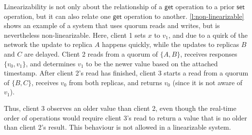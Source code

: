 Linearizability is not only about the relationship of a $\mathsf{get}$ operation to a prior $\mathsf{set}$ operation, but it can also relate one $\mathsf{get}$ operation to another.
\autoref{l:non-linearizable} shows an example of a system that uses quorum reads and writes, but is nevertheless non-linearizable.
Here, client 1 sets $x$ to $v_1$, and due to a quirk of the network the update to replica $A$ happens quickly, while the updates to replicas $B$ and $C$ are delayed.
Client 2 reads from a quorum of $\{A,B\}$, receives responses $\{v_0,v_1\}$, and determines $v_1$ to be the newer value based on the attached timestamp.
After client 2's read has finished, client 3 starts a read from a quorum of $\{B,C\}$, receives $v_0$ from both replicas, and returns $v_0$ (since it is not aware of $v_1$).

Thus, client 3 observes an older value than client 2, even though the real-time order of operations would require client 3's read to return a value that is no older than client 2's result.
This behaviour is not allowed in a linearizable system.


